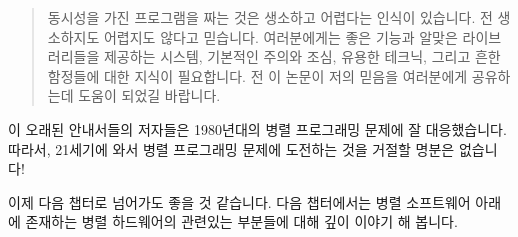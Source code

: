 \begin{quote}
	동시성을 가진 프로그램을 짜는 것은 생소하고 어렵다는 인식이 있습니다.
	전 생소하지도 어렵지도 않다고 믿습니다.
	여러분에게는 좋은 기능과 알맞은 라이브러리들을 제공하는 시스템,
	기본적인 주의와 조심, 유용한 테크닉, 그리고 흔한 함정들에 대한 지식이
	필요합니다.
	전 이 논문이 저의 믿음을 여러분에게 공유하는데 도움이 되었길 바랍니다.

\end{quote}

이 오래된 안내서들의 저자들은 1980년대의 병렬 프로그래밍 문제에 잘
대응했습니다.
따라서, 21세기에 와서 병렬 프로그래밍 문제에 도전하는 것을 거절할 명분은
없습니다!

이제 다음 챕터로 넘어가도 좋을 것 같습니다. 다음 챕터에서는 병렬 소프트웨어
아래에 존재하는 병렬 하드웨어의 관련있는 부분들에 대해 깊이 이야기 해 봅니다.

